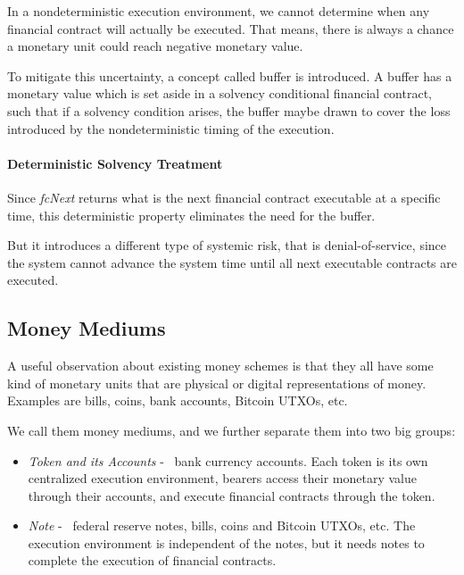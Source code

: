 In a nondeterministic execution environment, we cannot determine when any financial contract will
actually be executed. That means, there is always a chance a monetary unit could reach negative
monetary value.

To mitigate this uncertainty, a concept called buffer is introduced. A buffer has a monetary value
which is set aside in a solvency conditional financial contract, such that if a solvency condition
arises, the buffer maybe drawn to cover the loss introduced by the nondeterministic timing of the
execution.

\paragraph{Deterministic Solvency Treatment}

Since \textit{fcNext} returns what is the next financial contract executable at a specific time,
this deterministic property eliminates the need for the buffer.

But it introduces a different type of systemic risk, that is denial-of-service, since the system
cannot advance the system time until all next executable contracts are executed.

\subsection{Money Mediums}

\begin{displayquote}
A useful observation about existing money schemes is that they all have some kind of monetary units
that are physical or digital representations of money. Examples are bills, coins, bank accounts,
Bitcoin UTXOs, etc. 
\end{displayquote}

We call them money mediums, and we further separate them into two big groups:

\begin{itemize}
    \item \textit{Token and its Accounts} - \eg\ bank currency accounts. Each token is its own
centralized execution environment, bearers access their monetary value through their accounts, and
execute financial contracts through the token.

    \item \textit{Note} - \eg\ federal reserve notes, bills, coins and Bitcoin UTXOs, etc. The
execution environment is independent of the notes, but it needs notes to complete the execution of
financial contracts.
\end{itemize}

